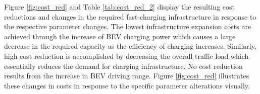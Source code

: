 \documentclass[journal,article,submit,pdftex,moreauthors]{Definitions/mdpi}
\begin{document}
Figure \ref{fig:cost_red} and Table \ref{tab:cost_red_2} display the resulting cost reductions and changes in the required fast-charging infrastructure in response to the respective parameter changes. The lowest infrastructure expansion costs are achieved through the increase of BEV charging power which causes a large decrease in the required capacity as the efficiency of charging increases. Similarly, high cost reduction is accomplished  by decreasing the overall traffic load which essentially reduces the demand for charging infrastructure. No cost reduction results from the increase in BEV driving range. Figure \ref{fig:cost_red} illustrates these changes in costs in response to the specific parameter alterations visually. 
\begin{table}[H]
\centering
\caption{Description of input parameter alterations reducing costs in the \textit{Gradual Development} (\textit{GD}) scenario. The parameter alterations are based on the other three scenarios: \textit{Societal Commitment} (\textit{SC}), \textit{Techno-Friendly} (\textit{TF}),  \textit{Directed Transition} (\textit{DT}). \label{tab:cost_red}}


\end{table}
\end{document}
